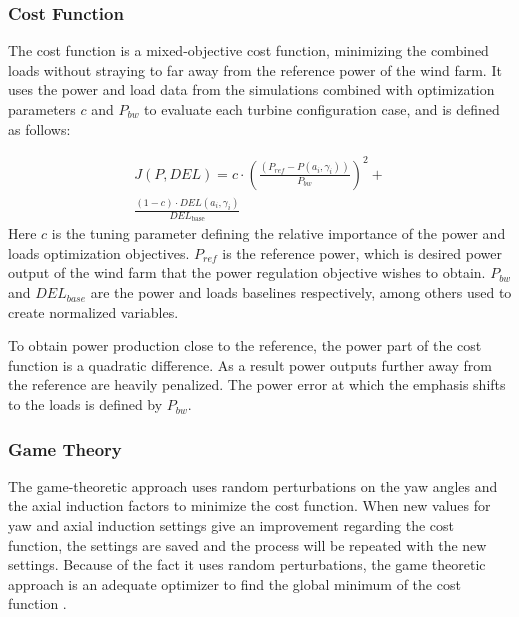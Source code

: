 \subsubsection{Cost Function} \label{sec:costfunction}

The cost function is a mixed-objective cost function, minimizing the combined loads without straying to far away from the reference power of the wind farm. It uses the power and load data from the simulations combined with optimization parameters $c$ and $P_{bw}$ to evaluate each turbine configuration case, and is defined as follows: 

\begin{equation}
\begin{aligned}
J(P,DEL) = c\cdot(\frac{(P_{ref}-P(a_i,\gamma_i))}{P_{bw}})^2  + \\
\frac{(1-c)\cdot DEL(a_i,\gamma_i)}{DEL_\text{{base}}}
\end{aligned}
 \label{eq:costf}
\end{equation}
Here $c$ is the tuning parameter defining the relative importance of the power and loads optimization objectives. $P_{ref}$ is the reference power, which is desired power output of the wind farm that the power regulation objective wishes to obtain. $P_{bw}$ and $DEL_{base}$ are the power and loads baselines respectively, among others used to create normalized variables.
\newline

To obtain power production close to the reference, the power part of the cost function is a quadratic difference. As a result power outputs further away from the reference are heavily penalized. The power error at which the emphasis shifts to the loads is defined by $P_{bw}$.


\subsubsection{Game Theory} \label{sec:gametheory}
The game-theoretic approach uses random perturbations on the yaw angles and the axial induction factors to minimize the cost function. When new values for yaw and axial induction settings give an improvement regarding the cost function, the settings are saved and the process will be repeated with the new settings. Because of the fact it uses random perturbations, the game theoretic approach is an adequate optimizer to find the global minimum of the cost function \cite{Dijk2016}.




